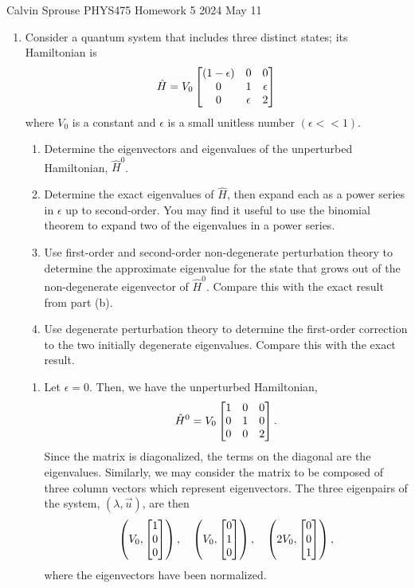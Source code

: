 \documentclass[a4paper, 12pt]{config/homework}
\begin{document}
\noindent
Calvin Sprouse \hfill PHYS475 Homework 5 \hfill 2024 May 11
\bigskip

\begin{enumerate}
\item Consider a quantum system that includes three distinct states; its Hamiltonian is
\[\hat{H} = V_0 \left[ \begin{matrix} (1-\epsilon) & 0 & 0 \\ 0 & 1 & \epsilon \\ 0 & \epsilon & 2 \end{matrix} \right]\]
where \(V_0\) is a constant and \(\epsilon\) is a small unitless number \(\left(\epsilon << 1\right)\).
\begin{enumerate}[label=(\alph*)]
\item Determine the eigenvectors and eigenvalues of the unperturbed Hamiltonian, \(\hat{H}^0\).
\item Determine the exact eigenvalues of \(\hat{H}\), then expand each as a power series in \(\epsilon\) up to second-order. You may find it useful to use the binomial theorem to expand two of the eigenvalues in a power series.
\item Use first-order and second-order non-degenerate perturbation theory to determine the approximate eigenvalue for the state that grows out of the non-degenerate eigenvector of \(\hat{H}^0\). Compare this with the exact result from part (b).
\item Use degenerate perturbation theory to determine the first-order correction to the two initially degenerate eigenvalues. Compare this with the exact result.
\end{enumerate}
\bigskip
\begin{enumerate}[label=(\alph*)]
\item Let \(\epsilon = 0\). Then, we have the unperturbed Hamiltonian,
\[\hat{H}^0 = V_0\left[ \begin{matrix} 1 & 0 & 0 \\ 0 & 1 & 0 \\ 0 & 0 & 2 \end{matrix} \right].\]
Since the matrix is diagonalized, the terms on the diagonal are the eigenvalues. Similarly, we may consider the matrix to be composed of three column vectors which represent eigenvectors. The three eigenpairs of the system, \(\left(\lambda, \vec{u}\right)\), are then
\[  \left(V_0, \left[ \begin{matrix} 1 \\ 0 \\ 0 \end{matrix} \right]\right), \quad
    \left(V_0, \left[ \begin{matrix} 0 \\ 1 \\ 0 \end{matrix} \right]\right), \quad
    \left(2V_0, \left[ \begin{matrix} 0 \\ 0 \\ 1 \end{matrix} \right]\right), \]
where the eigenvectors have been normalized.


\end{enumerate}
\end{enumerate}
\end{document}
